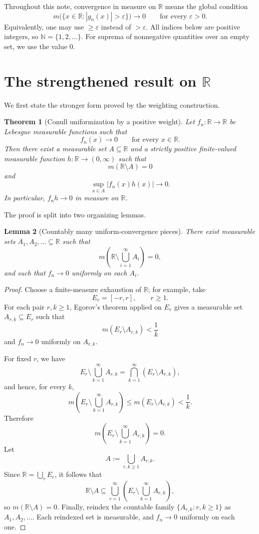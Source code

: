 \documentclass[11pt]{article}
\newcommand{\R}{\mathbb{R}}
\newcommand{\N}{\mathbb{N}}
\newcommand{\eps}{\varepsilon}
\theoremstyle{plain}
\newtheorem{theorem}{Theorem}[section]
\newtheorem{lemma}[theorem]{Lemma}
\theoremstyle{definition}
\theoremstyle{remark}
\begin{document}
Throughout this note, convergence in measure on $\R$ means the global
condition
\[
        m\bigl(\{x\in\R: |g_n(x)|>\eps\}\bigr)\longrightarrow 0
        \qquad\text{for every }\eps>0.
\]
Equivalently, one may use $\geq \eps$ instead of $>\eps$.
All indices below are positive integers, so $\N=\{1,2,\ldots\}$.
For suprema of nonnegative quantities over an empty set, we use the value $0$.

\section{The strengthened result on \texorpdfstring{$\R$}{R}}

We first state the stronger form proved by the weighting construction.

\begin{theorem}[Conull uniformization by a positive weight]\label{thm:main-R}
Let $f_n:\R\to\R$ be Lebesgue measurable functions such that
\[
        f_n(x)\to 0
        \qquad\text{for every }x\in\R.
\]
Then there exist a measurable set $A\subseteq\R$ and a strictly positive
finite-valued measurable function $h:\R\to(0,\infty)$ such that
\[
        m(\R\setminus A)=0
\]
and
\[
        \sup_{x\in A}|f_n(x)h(x)|\longrightarrow 0.
\]
In particular, $f_nh\to 0$ in measure on $\R$.
\end{theorem}

The proof is split into two organizing lemmas.

\begin{lemma}[Countably many uniform-convergence pieces]\label{lem:egorov-pieces}
There exist measurable sets $A_1,A_2,\dots\subseteq\R$ such that
\[
        m\left(\R\setminus \bigcup_{i=1}^\infty A_i\right)=0,
\]
and such that $f_n\to 0$ uniformly on each $A_i$.
\end{lemma}

\begin{proof}
Choose a finite-measure exhaustion of $\R$; for example, take
\[
        E_r=[-r,r],\qquad r\geq 1.
\]
For each pair $r,k\geq 1$, Egorov's theorem applied on $E_r$ gives a
measurable set $A_{r,k}\subseteq E_r$ such that
\[
        m(E_r\setminus A_{r,k})<\frac{1}{k}
\]
and $f_n\to 0$ uniformly on $A_{r,k}$.

For fixed $r$, we have
\[
        E_r\setminus \bigcup_{k=1}^\infty A_{r,k}
        =\bigcap_{k=1}^\infty (E_r\setminus A_{r,k}),
\]
and hence, for every $k$,
\[
        m\left(E_r\setminus \bigcup_{k=1}^\infty A_{r,k}\right)
        \leq m(E_r\setminus A_{r,k})<\frac{1}{k}.
\]
Therefore
\[
        m\left(E_r\setminus \bigcup_{k=1}^\infty A_{r,k}\right)=0.
\]
Let
\[
        A:=\bigcup_{r,k\geq 1}A_{r,k}.
\]
Since $\R=\bigcup_r E_r$, it follows that
\[
        \R\setminus A
        \subseteq
        \bigcup_{r=1}^\infty
        \left(E_r\setminus \bigcup_{k=1}^\infty A_{r,k}\right),
\]
so $m(\R\setminus A)=0$.  Finally, reindex the countable family
$\{A_{r,k}:r,k\geq 1\}$ as $A_1,A_2,\dots$.  Each reindexed set is measurable,
and $f_n\to 0$ uniformly on each one.
\end{proof}
\end{document}
